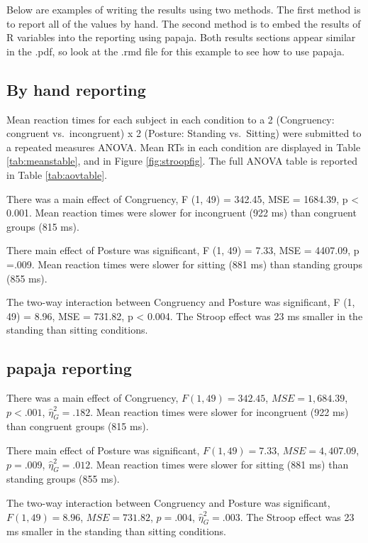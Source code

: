 \documentclass[
  english,
  man,floatsintext]{apa6}
\begin{document}
Below are examples of writing the results using two methods. The first method is to report all of the values by hand. The second method is to embed the results of R variables into the reporting using papaja. Both results sections appear similar in the .pdf, so look at the .rmd file for this example to see how to use papaja.

\hypertarget{by-hand-reporting}{%
\subsection{By hand reporting}\label{by-hand-reporting}}

Mean reaction times for each subject in each condition to a 2 (Congruency: congruent vs.~incongruent) x 2 (Posture: Standing vs.~Sitting) were submitted to a repeated measures ANOVA. Mean RTs in each condition are displayed in Table \ref{tab:meanstable}, and in Figure \ref{fig:stroopfig}. The full ANOVA table is reported in Table \ref{tab:aovtable}.

There was a main effect of Congruency, F (1, 49) = 342.45, MSE = 1684.39, p \textless{} 0.001. Mean reaction times were slower for incongruent (922 ms) than congruent groups (815 ms).

There main effect of Posture was significant, F (1, 49) = 7.33, MSE = 4407.09, p =.009. Mean reaction times were slower for sitting (881 ms) than standing groups (855 ms).

The two-way interaction between Congruency and Posture was significant, F (1, 49) = 8.96, MSE = 731.82, p \textless{} 0.004. The Stroop effect was 23 ms smaller in the standing than sitting conditions.

\hypertarget{papaja-reporting}{%
\subsection{papaja reporting}\label{papaja-reporting}}

There was a main effect of Congruency, \(F(1, 49) = 342.45\), \(\mathit{MSE} = 1,684.39\), \(p < .001\), \(\hat{\eta}^2_G = .182\). Mean reaction times were slower for incongruent (922 ms) than congruent groups (815 ms).

There main effect of Posture was significant, \(F(1, 49) = 7.33\), \(\mathit{MSE} = 4,407.09\), \(p = .009\), \(\hat{\eta}^2_G = .012\). Mean reaction times were slower for sitting (881 ms) than standing groups (855 ms).

The two-way interaction between Congruency and Posture was significant, \(F(1, 49) = 8.96\), \(\mathit{MSE} = 731.82\), \(p = .004\), \(\hat{\eta}^2_G = .003\). The Stroop effect was 23 ms smaller in the standing than sitting conditions.
\end{document}
